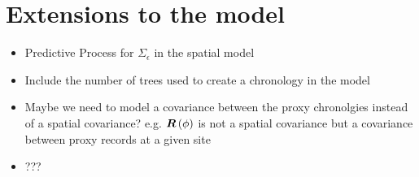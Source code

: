 \documentclass{article}\usepackage[]{graphicx}\usepackage[]{color}
\def\bm#1{\mbox{\boldmath $#1$}}
\begin{document}
\section{Extensions to the model}
%
\begin{itemize}
%
\item Predictive Process for $\Sigma_\epsilon$ in the spatial model
\item Include the number of trees used to create a chronology in the model
\item Maybe we need to model a covariance between the proxy chronolgies instead of a spatial covariance? e.g. $\bm{R} \left( \phi \right)$ is not a spatial covariance but a covariance between proxy records at a given site
\item ???
%
\end{itemize}
% 
\end{document}

